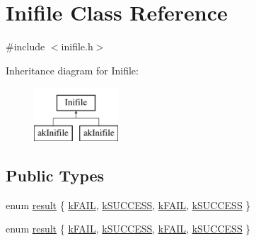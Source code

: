 \hypertarget{classInifile}{\section{Inifile Class Reference}
\label{classInifile}
}


{\ttfamily \#include $<$inifile.\-h$>$}

Inheritance diagram for Inifile\-:\begin{figure}[H]
\begin{center}
\leavevmode
\includegraphics[height=2.000000cm]{classInifile}
\end{center}
\end{figure}
\subsection*{Public Types}
\begin{DoxyCompactItemize}
\item 
enum \hyperlink{classInifile_a42a1cfa6fc8618c8b28d449626f0ecde}{result} \{ \hyperlink{classInifile_a42a1cfa6fc8618c8b28d449626f0ecdeaf094f928f6263c0a635dc56877ada5ee}{k\-F\-A\-I\-L}, 
\hyperlink{classInifile_a42a1cfa6fc8618c8b28d449626f0ecdea729ee722b08e740339d4655b478da609}{k\-S\-U\-C\-C\-E\-S\-S}, 
\hyperlink{classInifile_a42a1cfa6fc8618c8b28d449626f0ecdeaf094f928f6263c0a635dc56877ada5ee}{k\-F\-A\-I\-L}, 
\hyperlink{classInifile_a42a1cfa6fc8618c8b28d449626f0ecdea729ee722b08e740339d4655b478da609}{k\-S\-U\-C\-C\-E\-S\-S}
 \}
\item 
enum \hyperlink{classInifile_a42a1cfa6fc8618c8b28d449626f0ecde}{result} \{ \hyperlink{classInifile_a42a1cfa6fc8618c8b28d449626f0ecdeaf094f928f6263c0a635dc56877ada5ee}{k\-F\-A\-I\-L}, 
\hyperlink{classInifile_a42a1cfa6fc8618c8b28d449626f0ecdea729ee722b08e740339d4655b478da609}{k\-S\-U\-C\-C\-E\-S\-S}, 
\hyperlink{classInifile_a42a1cfa6fc8618c8b28d449626f0ecdeaf094f928f6263c0a635dc56877ada5ee}{k\-F\-A\-I\-L}, 
\hyperlink{classInifile_a42a1cfa6fc8618c8b28d449626f0ecdea729ee722b08e740339d4655b478da609}{k\-S\-U\-C\-C\-E\-S\-S}
 \}
\end{DoxyCompactItemize}
